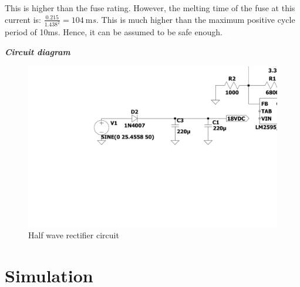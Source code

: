 This is higher than the fuse rating. However, the melting time of the fuse at this current is: $ \frac{0.215}{1.438^2} = \SI{104}{\milli s}$\cite{Fuse}. This is much higher than the maximum positive cycle period of 10ms. Hence, it can be assumed to be safe enough.


\noindent\textbf{\textit{Circuit diagram}}
\begin{figure}[h]
    \centering
    \includegraphics[clip, trim = 3cm 7cm 2cm 3.7cm,width = 0.75\linewidth]{Figures/rectifier_circuit.pdf}
    \caption{Half wave rectifier circuit}
    \label{fig:rectifier_circuit}
\end{figure}


\section{Simulation} \label{sec:simulation_rectifier}

